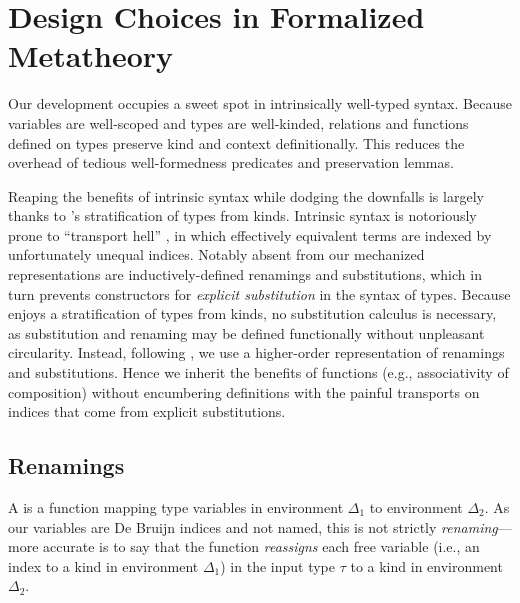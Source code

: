 \documentclass[sigplan,screen]{acmart}
\newif\ifdesign\designtrue
\begin{document}

\section{Design Choices in Formalized Metatheory}
\label{sec:design}
\ifdesign

Our development occupies a sweet spot in intrinsically well-typed syntax. Because variables are well-scoped and types are well-kinded, relations and functions defined on types preserve kind and context definitionally. This reduces the overhead of tedious well-formedness predicates and preservation lemmas. 


Reaping the benefits of intrinsic syntax while dodging the downfalls is largely thanks to \Rome{}'s stratification of types from kinds. Intrinsic syntax is notoriously prone to ``transport hell'' \citep{SaffrichTM24, ChenNFT26}, in which effectively equivalent terms are indexed by unfortunately unequal indices. Notably absent from our mechanized representations are inductively-defined renamings and substitutions, which in turn prevents constructors for \emph{explicit substitution} in the syntax of types. Because \Rome{} enjoys a stratification of types from kinds, no substitution calculus is necessary, as substitution and renaming may be defined functionally without unpleasant circularity. Instead, following \citet{ChapmanKNW19}, we use a higher-order representation of renamings and substitutions. Hence we inherit the benefits of functions (e.g., associativity of composition) without encumbering definitions with the painful transports on indices that come from explicit substitutions.

\subsection{Renamings}

A  is a function mapping type variables in environment $\Delta_1$ to environment $\Delta_2$. As our variables are De Bruijn indices and not named, this is not strictly \emph{renaming}---more accurate is to say that the function  \emph{reassigns} each free variable (i.e., an index to a kind in environment $\Delta_1$) in the input type $\tau$ to a kind in environment $\Delta_2$.
\end{document}
